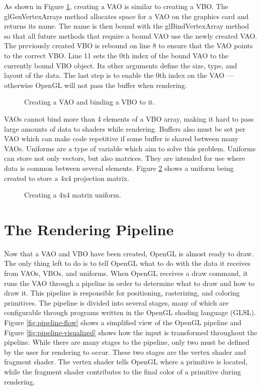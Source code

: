 \documentclass{article}
\begin{document}
As shown in Figure \ref{fig:create-vao}, creating a VAO is similar to creating a VBO. The glGenVertexArrays method allocates space for a VAO on the graphics card and returns its name. The name is then bound with the glBindVertexArray method so that all future methods that require a bound VAO use the newly created VAO. The previously created VBO is rebound on line 8 to ensure that the VAO points to the correct VBO. Line 11 sets the 0th index of the bound VAO to the currently bound VBO object. Its other arguments define the size, type, and layout of the data. The last step is to enable the 0th index on the VAO --- otherwise OpenGL will not pass the buffer when rendering.

\begin{figure}[h]
	
	\caption{Creating a VAO and binding a VBO to it.}
	\label{fig:create-vao}
\end{figure}

VAOs cannot bind more than 4 elements of a VBO array, making it hard to pass large amounts of data to shaders while rendering. Buffers also must be set per VAO which can make code repetitive if some buffer is shared between many VAOs. Uniforms are a type of variable which aim to solve this problem. Uniforms can store not only vectors, but also matrices. They are intended for use where data is common between several elements. Figure \ref{fig:matrix-uniform} shows a uniform being created to store a 4x4 projection matrix.

\begin{figure}[h]
	
	\caption{Creating a 4x4 matrix uniform.}
	\label{fig:matrix-uniform}
\end{figure}

\section{The Rendering Pipeline}
Now that a VAO and VBO have been created, OpenGL is almost ready to draw. The only thing left to do is to tell OpenGL what to do with the data it receives from VAOs, VBOs, and uniforms. When OpenGL receives a draw command, it runs the VAO through a pipeline in order to determine what to draw and how to draw it. This pipeline is responsible for positioning, rasterizing, and coloring primitives. The pipeline is divided into several stages, many of which are configurable through programs written in the OpenGL shading language (GLSL). Figure \ref{fig:pipeline-flow} shows a simplified view of the OpenGL pipeline and Figure \ref{fig:pipeline-visualized} shows how the input is transformed throughout the pipeline. While there are many stages to the pipeline, only two must be defined by the user for rendering to occur. These two stages are the vertex shader and fragment shader. The vertex shader tells OpenGL where a primitive is located, while the fragment shader contributes to the final color of a primitive during rendering.
\end{document}
